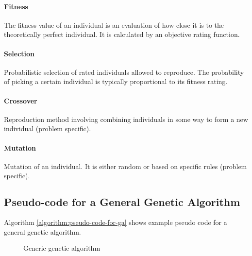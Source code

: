 \paragraph{Fitness}
The fitness value of an individual is an evaluation of how close it is to the theoretically perfect individual. It is calculated by an objective rating function.

\paragraph{Selection}
Probabilistic selection of rated individuals allowed to reproduce.
The probability of picking a certain individual is typically proportional to its fitness rating.

\paragraph{Crossover}
Reproduction method involving combining individuals in some way to form a new individual (problem specific). 

\paragraph{Mutation}
Mutation of an individual. It is either random or based on specific rules (problem specific). 

\subsection{Pseudo-code for a General Genetic Algorithm}

Algorithm \vref{algorithm:pseudo-code-for-ga} shows example pseudo code for a general genetic algorithm.

\begin{figure}[H]
\begin{algorithm}[H]
\SetAlgoLined
\DontPrintSemicolon
{}
\caption{Generic genetic algorithm}
\label{algorithm:pseudo-code-for-ga}
\end{algorithm}
\end{figure}


